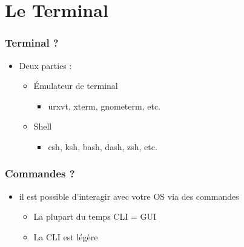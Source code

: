 \section{Le Terminal} 
\begin{frame}
        \frametitle{Terminal ?}
	\begin{itemize}
	    \item Deux parties :
	    \begin{itemize}
                \item<1 -> Émulateur de terminal 
		    \begin{itemize}
		    	\item urxvt, xterm, gnometerm, etc.
		    \end{itemize}
		\item<2 -> Shell
                    \begin{itemize}
			\item csh, ksh, bash, dash, zsh, etc.
	            \end{itemize}
            \end{itemize}
	\end{itemize}
\end{frame}
\begin{frame}
    \frametitle{Commandes ?}
    \begin{itemize}
        \item il est possible d'interagir avec votre OS via des commandes
            \begin{itemize}
                \item<1 -> La plupart du temps CLI = GUI
                \item<2 -> La CLI est légère
            \end{itemize}
    \end{itemize}
\end{frame}
